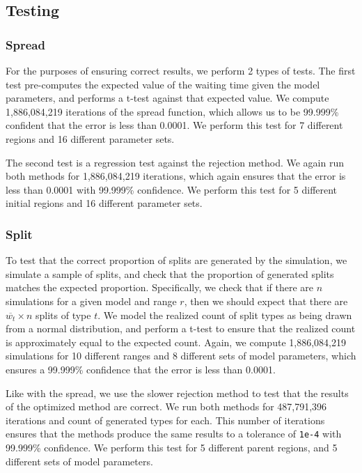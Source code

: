 \documentclass{article}
\begin{document}
\subsection{Testing}

\subsubsection{Spread}

For the purposes of ensuring correct results, we perform 2 types of tests.
The first test pre-computes the expected value of the waiting time given the
model parameters, and performs a t-test against that expected value.
We compute 1,886,084,219 iterations of the spread function, which allows us to
be 99.999\% confident that the error is less than 0.0001.
We perform this test for 7 different regions and 16 different parameter sets.

The second test is a regression test against the rejection method.
We again run both methods for 1,886,084,219 iterations, which again ensures
that the error is less than 0.0001 with 99.999\% confidence.
We perform this test for 5 different initial regions and 16 different parameter
sets.

\subsubsection{Split}

To test that the correct proportion of splits are generated by the simulation,
we simulate a sample of splits, and check that the proportion of generated
splits matches the expected proportion.
Specifically, we check that if there are \(n\) simulations for a given model
and range \( r \), then we should expect that there are \(\overline{w_t} \times
n\) splits of type \( t \).
We model the realized count of split types as being drawn from a normal
distribution, and perform a t-test to ensure that the realized count is
approximately equal to the expected count.
Again, we compute 1,886,084,219 simulations for 10 different ranges and 8
different sets of model parameters, which ensures a 99.999\% confidence that
the error is less than 0.0001.

Like with the spread, we use the slower rejection method to test that the
results of the optimized method are correct.
We run both methods for 487,791,396 iterations and count of generated types for
each.
This number of iterations ensures that the methods produce the same results to
a tolerance of \texttt{1e-4} with 99.999\% confidence.
We perform this test for 5 different parent regions, and 5 different sets of
model parameters.
\end{document}
